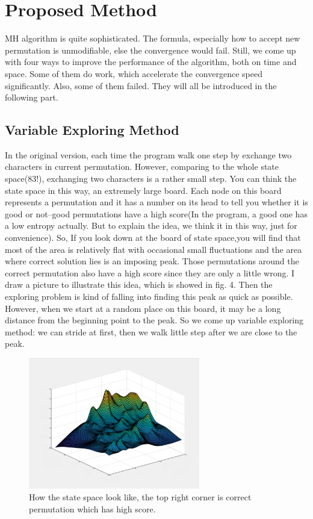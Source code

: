 \documentclass{acmtog} %
\begin{document}
\section{Proposed Method}
MH algorithm is quite sophisticated. The formula, especially how to accept new permutation is unmodifiable, else the convergence would fail. Still, we come up with four ways to improve the performance of the algorithm, both on time and space. Some of them do work, which accelerate the convergence speed significantly. Also, some of them failed. They will all be introduced in the following part.
\subsection{Variable Exploring Method}
In the original version, each time the program walk one step by exchange two characters in current permutation. However, comparing to the whole state space(83!), exchanging two characters is a rather small step. You can think the state space in this way, an extremely large board. Each node on this board represents a permutation and it has a number on its head to tell you whether it is good or not--good permutations have a high score(In the program, a good one has a low entropy actually. But to explain the idea, we think it in this way, just for convenience). So, If you look down at the board of state space,you will find that most of the area is relatively flat with occasional small fluctuations and the area where correct solution lies is an imposing peak. Those permutations around the correct permutation also have a high score since they are only a little wrong. I draw a picture to illustrate this idea, which is showed in fig. 4. Then the exploring problem is kind of falling into finding this peak as quick as possible. However, when we start at a random place on this board, it may be a long distance from the beginning point to the peak. So we come up variable exploring method: we can stride at first, then we walk little step after we are close to the peak. 
\begin{figure}[htb]
\centerline{\includegraphics[width=7.5cm]{pic/solutionspace.png}}
\caption{How the state space look like, the top right corner is correct permutation which has high score.}
  \label{statespace}
\end{figure}
\end{document}
